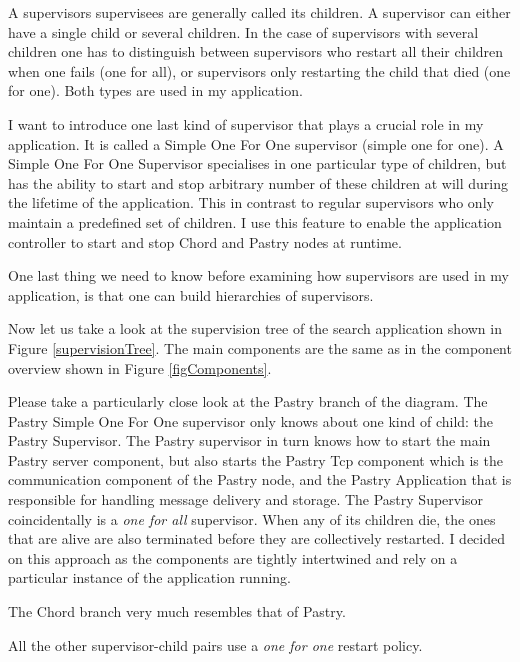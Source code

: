 A supervisors supervisees are generally called its children. A supervisor can either have a single child or several children. In the case of supervisors with several children one has to distinguish between supervisors who restart all their children when one fails (one for all), or supervisors only restarting the child that died (one for one). Both types are used in my application. 

I want to introduce one last kind of supervisor that plays a crucial role in my application. It is called a Simple One For One supervisor (simple one for one). A Simple One For One Supervisor specialises in one particular type of children, but has the ability to start and stop arbitrary number of these children at will during the lifetime of the application. This in contrast to regular supervisors who only maintain a predefined set of children. I use this feature to enable the application controller to start and stop Chord and Pastry nodes at runtime.

One last thing we need to know before examining how supervisors are used in my application, is that one can build hierarchies of supervisors.

Now let us take a look at the supervision tree of the search application shown in Figure \ref{supervisionTree}.
The main components are the same as in the component overview shown in Figure \ref{figComponents}.

Please take a particularly close look at the Pastry branch of the diagram. The Pastry Simple One For One supervisor only knows about one kind of child: the Pastry Supervisor. The Pastry supervisor in turn knows how to start the main Pastry server component, but also starts the Pastry Tcp component which is the communication component of the Pastry node, and the Pastry Application that is responsible for handling message delivery and storage. The Pastry Supervisor coincidentally is a \emph{one for all} supervisor. When any of its children die, the ones that are alive are also terminated before they are collectively restarted. I decided on this approach as the components are tightly intertwined and rely on a particular instance of the application running.

The Chord branch very much resembles that of Pastry. 

All the other supervisor-child pairs use a \emph{one for one} restart policy.

